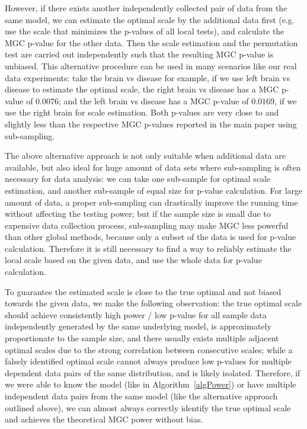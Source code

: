\documentclass[11pt]{article}
\begin{document}
However, if there exists another independently collected pair of data from the same model, we can estimate the optimal scale by the additional data first (e.g. use the scale that minimizes the p-values of all local tests), and calculate the MGC p-value for the other data. Then the scale estimation and the permutation test are carried out independently such that the resulting MGC p-value is unbiased. This alternative procedure can be used in many scenarios like our real data experiments: take the brain vs disease for example, if we use left brain vs disease to estimate the optimal scale, the right brain vs disease has a MGC p-value of $0.0076$; and the left brain vs disease has a MGC p-value of $0.0169$, if we use the right brain for scale estimation. Both p-values are very close to and slightly less than the respective MGC p-values reported in the main paper using sub-sampling.

The above alternative approach is not only suitable when additional data are available, but also ideal for huge amount of data sets where sub-sampling is often necessary for data analysis: we can take one sub-sample for optimal scale estimation, and another sub-sample of equal size for p-value calculation. For large amount of data, a proper sub-sampling can drastically improve the running time without affecting the testing power; but if the sample size is small due to expensive data collection process, sub-sampling may make MGC less powerful than other global methods, because only a subset of the data is used for p-value calculation. Therefore it is still necessary to find a way to reliably estimate the local scale based on the given data, and use the whole data for p-value calculation.

To guarantee the estimated scale is close to the true optimal and not biased towards the given data, we make the following observation: the true optimal scale should achieve consistently high power / low p-value for all sample data independently generated by the same underlying model, is approximately proportionate to the sample size, and there usually exists multiple adjacent optimal scales due to the strong correlation between consecutive scales; while a falsely identified optimal scale cannot always produce low p-values for multiple dependent data pairs of the same distribution, and is likely isolated. Therefore, if we were able to know the model (like in Algorithm~\ref{algPower}) or have multiple independent data pairs from the same model (like the alternative approach outlined above), we can almost always correctly identify the true optimal scale and achieves the theoretical MGC power without bias.
\end{document}
